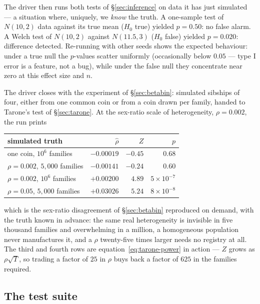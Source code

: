 \documentclass[11pt]{article}
\numberwithin{equation}{section}
\begin{document}
The driver then runs both tests of \S\ref{sec:inference} on data it has
just simulated --- a situation where, uniquely, we \emph{know} the truth.
A one-sample test of $N(10,2)$ data against its true mean ($H_0$ true)
yielded $p=0.50$: no false alarm.  A Welch test of $N(10,2)$ against
$N(11.5,3)$ ($H_0$ false) yielded $p=0.020$: difference detected.
Re-running with other seeds shows the expected behaviour: under a true
null the $p$-values scatter uniformly (occasionally below $0.05$ --- type
I error is a feature, not a bug), while under the false null they
concentrate near zero at this effect size and $n$.

The driver closes with the experiment of \S\ref{sec:betabin}: simulated
sibships of four, either from one common coin or from a coin drawn per
family, handed to Tarone's test of \S\ref{sec:tarone}.  At the sex-ratio
scale of heterogeneity, $\rho=0.002$, the run prints

\begin{center}\small
\begin{tabular}{lrrr}
\toprule
simulated truth & $\hat\rho$ & $Z$ & $p$ \\
\midrule
one coin, $10^6$ families        & $-0.00019$ & $-0.45$ & $0.68$ \\
$\rho=0.002$, $5{,}000$ families & $-0.00141$ & $-0.24$ & $0.60$ \\
$\rho=0.002$, $10^6$ families    & $+0.00200$ & $4.89$  & $5\times10^{-7}$ \\
$\rho=0.05$, $5{,}000$ families  & $+0.03026$ & $5.24$  & $8\times10^{-8}$ \\
\bottomrule
\end{tabular}
\end{center}

\noindent
which is the sex-ratio disagreement of \S\ref{sec:betabin} reproduced on
demand, with the truth known in advance: the same real heterogeneity is
invisible in five thousand families and overwhelming in a million, a
homogeneous population never manufactures it, and a $\rho$ twenty-five
times larger needs no registry at all.  The third and fourth rows are
equation~\eqref{eq:tarone-power} in action --- $Z$ grows as
$\rho\sqrt{T}$, so trading a factor of $25$ in $\rho$ buys back a factor
of $625$ in the families required.

\subsection{The test suite}\label{sec:tests}
\end{document}
